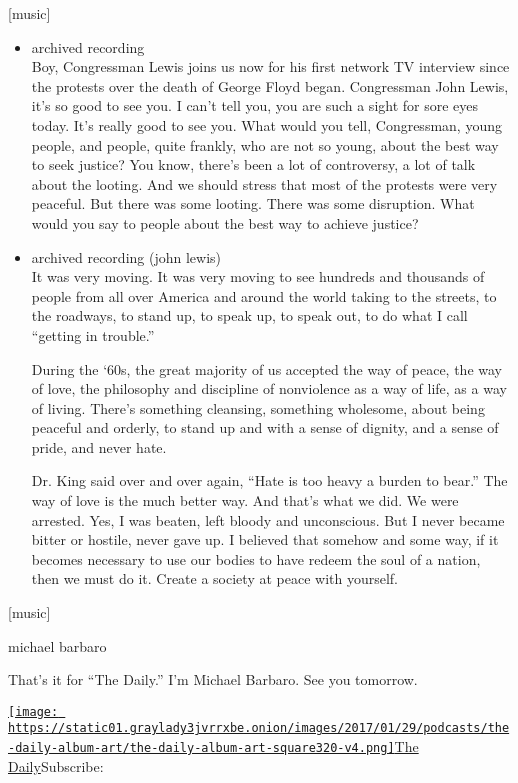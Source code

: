 {[}music{]}

\begin{itemize}
\item
  archived recording\\
  Boy, Congressman Lewis joins us now for his first network TV interview
  since the protests over the death of George Floyd began. Congressman
  John Lewis, it's so good to see you. I can't tell you, you are such a
  sight for sore eyes today. It's really good to see you. What would you
  tell, Congressman, young people, and people, quite frankly, who are
  not so young, about the best way to seek justice? You know, there's
  been a lot of controversy, a lot of talk about the looting. And we
  should stress that most of the protests were very peaceful. But there
  was some looting. There was some disruption. What would you say to
  people about the best way to achieve justice?
\item
  archived recording (john lewis)\\
  It was very moving. It was very moving to see hundreds and thousands
  of people from all over America and around the world taking to the
  streets, to the roadways, to stand up, to speak up, to speak out, to
  do what I call ``getting in trouble.''

  During the `60s, the great majority of us accepted the way of peace,
  the way of love, the philosophy and discipline of nonviolence as a way
  of life, as a way of living. There's something cleansing, something
  wholesome, about being peaceful and orderly, to stand up and with a
  sense of dignity, and a sense of pride, and never hate.

  Dr. King said over and over again, ``Hate is too heavy a burden to
  bear.'' The way of love is the much better way. And that's what we
  did. We were arrested. Yes, I was beaten, left bloody and unconscious.
  But I never became bitter or hostile, never gave up. I believed that
  somehow and some way, if it becomes necessary to use our bodies to
  have redeem the soul of a nation, then we must do it. Create a society
  at peace with yourself.
\end{itemize}

{[}music{]}

michael barbaro

That's it for ``The Daily.'' I'm Michael Barbaro. See you tomorrow.

\href{https://www.nytimes3xbfgragh.onion/column/the-daily}{\texttt{[image: https://static01.graylady3jvrrxbe.onion/images/2017/01/29/podcasts/the-daily-album-art/the-daily-album-art-square320-v4.png]}The
Daily}Subscribe:

